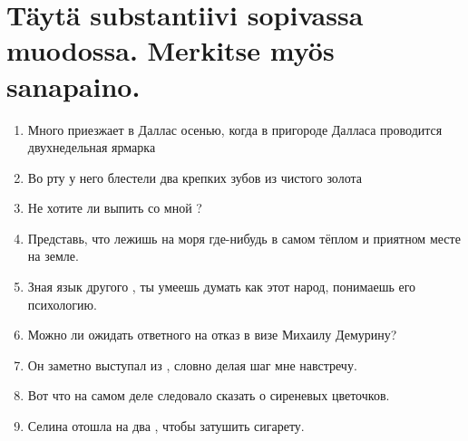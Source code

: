 \documentclass[paper=a4, fontsize=11pt]{scrartcl}
\begin{document}
\onehalfspacing

\section{Täytä substantiivi sopivassa muodossa. Merkitse myös sanapaino.}

\begin{enumerate}
    \item Много  приезжает в Даллас осенью, когда в пригороде Далласа проводится двухнедельная ярмарка
    \item Во рту у него блестели два   крепких зубов из чистого золота 
    \item Не хотите ли выпить со мной  ? 
    \item Представь, что лежишь на   моря где-нибудь в самом тёплом и приятном месте на земле.
    \item Зная язык другого , ты умеешь думать как этот народ, понимаешь его психологию.
    \item Можно ли ожидать ответного   на отказ в визе Михаилу Демурину? 
    \item Он заметно выступал из , словно делая шаг мне навстречу.
    \item Вот что на самом деле следовало сказать о   сиреневых цветочков.
    \item Селина отошла на два , чтобы затушить сигарету.
\end{enumerate}
\end{document}
